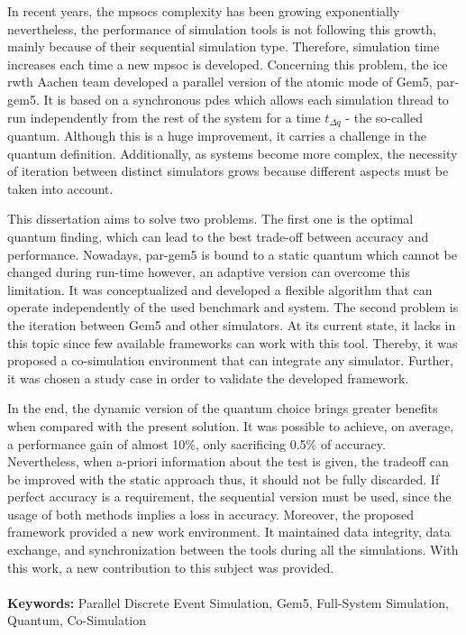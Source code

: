 





\vspace*{-0.5cm}

In recent years, the \glspl{mpsoc} complexity has been growing exponentially nevertheless, the performance of simulation tools is not 
following this growth, mainly because of their sequential simulation type. Therefore, simulation time increases each time a new \gls{mpsoc} 
is developed. Concerning this problem, the \gls{ice} \gls{rwth} Aachen team developed a parallel version of the atomic mode of Gem5, par-gem5. 
It is based on a synchronous \gls{pdes} which allows each simulation thread to run independently from the rest of the system for a time 
$t_{\Delta q}$ - the so-called quantum. Although this is a huge improvement, it carries a challenge in the quantum definition. 
Additionally, as systems become more complex, the necessity of iteration between distinct simulators grows because different aspects must be 
taken into account. 

This dissertation aims to solve two problems. The first one is the optimal quantum finding, which can lead to the best trade-off between 
accuracy and performance. Nowadays, par-gem5 is bound to a static quantum which cannot be changed during run-time however, an adaptive 
version can overcome this limitation. It was conceptualized and developed a flexible algorithm that can operate independently of 
the used benchmark and system. The second problem is the iteration between Gem5 and other simulators. At its current state, it lacks in this topic since few available 
frameworks can work with this tool. Thereby, it was proposed a co-simulation environment that can integrate any 
simulator. Further, it was chosen a study case in order to validate the developed framework. 

In the end, the dynamic version of the quantum choice brings greater benefits when compared with the present solution. It was possible to achieve, 
on average, a performance gain of almost 10\%, only sacrificing 0.5\% of accuracy. Nevertheless, when a-priori information about the 
test is given, the tradeoff can be improved with the static approach thus, it should not be fully discarded. 
If perfect accuracy is a requirement, the sequential version must be used, since the usage of both methods implies a loss in accuracy. 
Moreover, the proposed framework provided a new work environment. It maintained data integrity, data exchange, and synchronization 
between the tools during all the simulations. With this work, a new contribution to this subject was provided.

\paragraph{}\textbf{Keywords:} Parallel Discrete Event Simulation, Gem5, Full-System Simulation, Quantum, Co-Simulation
